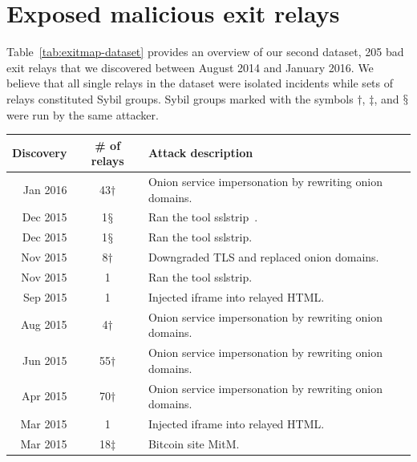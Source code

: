\appendix

\section{Exposed malicious exit relays}
\label{sec:malicious-relays}
Table~\ref{tab:exitmap-dataset} provides an overview of our second dataset, 205
bad exit relays that we discovered between August 2014 and January 2016.  We
believe that all single relays in the dataset were isolated incidents while sets
of relays constituted Sybil groups.  Sybil groups marked with the symbols
$\dagger$, $\ddagger$, and $\mathsection$ were run by the same attacker.

\begin{table}[t]
\small
\centering
\begin{tabular}{r c p{3.9cm}}
\hline
\textbf{Discovery} & \textbf{\# of relays} & \textbf{Attack description} \\
\hline
Jan 2016 & 43$\dagger$ & Onion service impersonation by rewriting onion domains. \\
Dec 2015 & 1$\mathsection$ & Ran the tool sslstrip~\cite{sslstrip}. \\
Dec 2015 & 1$\mathsection$ & Ran the tool sslstrip. \\
Nov 2015 & 8$\dagger$ & Downgraded TLS and replaced onion domains. \\
Nov 2015 & 1 & Ran the tool sslstrip. \\
Sep 2015 & 1 & Injected iframe into relayed HTML. \\
Aug 2015 & 4$\dagger$ & Onion service impersonation by rewriting onion domains. \\
Jun 2015 & 55$\dagger$ & Onion service impersonation by rewriting onion domains. \\
Apr 2015 & 70$\dagger$ & Onion service impersonation by rewriting onion domains. \\
Mar 2015 & 1 & Injected iframe into relayed HTML. \\
Mar 2015 & 18$\ddagger$ & Bitcoin site MitM. \\

\end{tabular}
\end{table}

